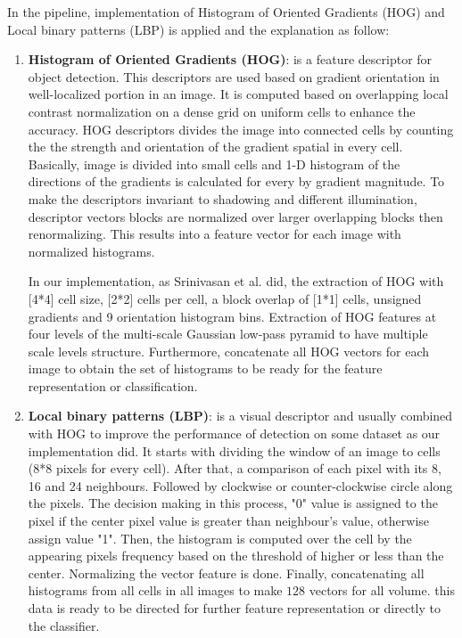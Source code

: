 In the pipeline, implementation of Histogram of Oriented Gradients (HOG) and Local binary patterns (LBP) is applied and the explanation as follow:
\begin{enumerate}
\item \textbf{Histogram of Oriented Gradients (HOG)}: is a feature descriptor for object detection.
This descriptors are used based on gradient orientation in well-localized portion in an image.
It is computed based on overlapping local contrast normalization on a dense grid on uniform cells to enhance the accuracy.
HOG descriptors divides the image into connected cells by counting the the strength and orientation of the gradient spatial in every cell.
Basically, image is divided into small cells and 1-D histogram of the directions of the gradients is calculated for every by gradient magnitude.
To make the descriptors invariant to shadowing and different illumination, descriptor vectors blocks are normalized over larger overlapping blocks then renormalizing.
This results into a feature vector for each image with normalized histograms.

In our implementation, as Srinivasan et al. did, the extraction of HOG with [4*4] cell size, [2*2] cells per cell, a block overlap of [1*1] cells, unsigned gradients and 9 orientation histogram bins.
Extraction of HOG features at four levels of the multi-scale Gaussian low-pass pyramid to have multiple scale levels structure.
Furthermore, concatenate all HOG vectors for each image to obtain the set of histograms to be ready for the feature representation or classification.  
\item \textbf{Local binary patterns (LBP)}: is a visual descriptor and usually combined with HOG to improve the performance of detection on some dataset as our implementation did.
It starts with dividing the window of an image to cells (8*8 pixels for every cell).
After that, a comparison of each pixel with its 8, 16 and 24 neighbours.
Followed by clockwise or counter-clockwise circle along the pixels.
The decision making in this process, "0" value is assigned to the pixel if the center pixel value is greater than neighbour’s value, otherwise assign value "1".
Then, the histogram is computed over the cell by the appearing pixels frequency based on the threshold of higher or less than the center.
Normalizing the vector feature is done.
Finally, concatenating all histograms from all cells in all images to make $128$ vectors for all volume.
this data is ready to be directed for further feature representation or directly to the classifier.
\end{enumerate} 

